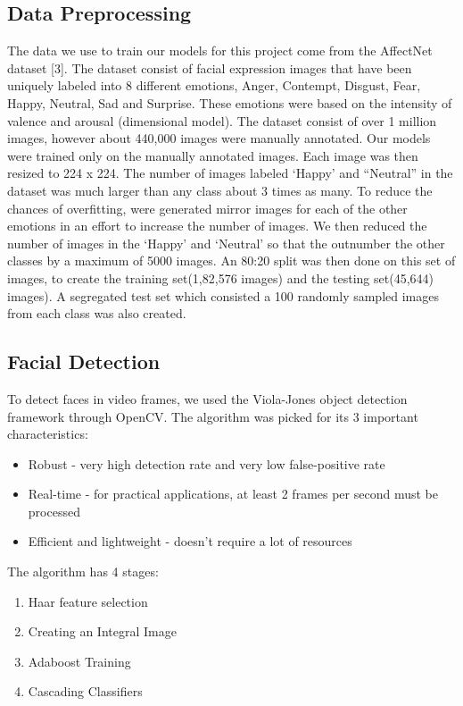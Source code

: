 \documentclass[10pt,twocolumn,letterpaper]{article}
\begin{document}
\subsection{Data Preprocessing}

The data we use to train our models for this project come from the AffectNet dataset [3]. The dataset consist of facial expression images that have been uniquely labeled into 8 different emotions, Anger, Contempt, Disgust, Fear, Happy, Neutral, Sad and Surprise. These emotions were based on the intensity of valence and arousal (dimensional model). The dataset consist of over 1 million images, however about 440,000 images were manually annotated. Our models were trained only on the manually annotated images.
Each image was then resized to 224 x 224. The number of images labeled ‘Happy’ and “Neutral” in the dataset was much larger than any class about 3 times as many. To reduce the chances of overfitting, were generated mirror images for each of the other emotions in an effort to increase the number of images. We then reduced the number of images in the ‘Happy’  and ‘Neutral’ so that the outnumber the other classes by a maximum of 5000 images.
An 80:20 split was then done on this set of images, to create the training set(1,82,576 images) and the testing set(45,644) images). A segregated test set which consisted a 100 randomly sampled images from each class was also created. 


\subsection{Facial Detection}

To detect faces in video frames, we used the Viola-Jones object detection framework through OpenCV. The algorithm was picked for its 3 important characteristics:
\begin{itemize}
  \item Robust - very high detection rate and very low false-positive rate
  \item Real-time - for practical applications, at least 2 frames per second must be processed
  \item Efficient and lightweight - doesn’t require a lot of resources
\end{itemize}

The algorithm has 4 stages:
\begin{enumerate}
  \item Haar feature selection
  \item Creating an Integral Image
  \item Adaboost Training
  \item Cascading Classifiers
\end{enumerate}
\end{document}
